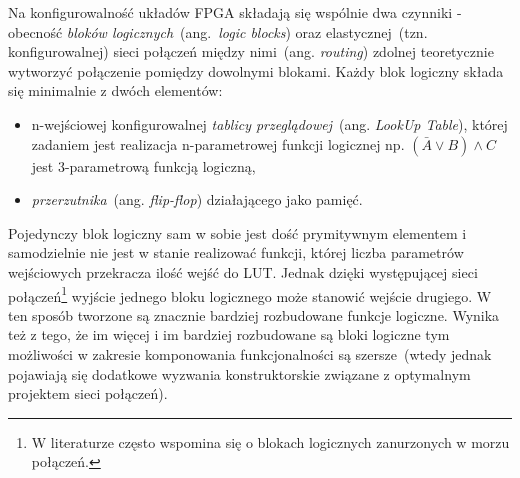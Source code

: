 Na konfigurowalność układów FPGA składają się wspólnie dwa czynniki - obecność \textit{bloków logicznych}~(ang.~\textit{logic blocks}) oraz elastycznej~(tzn. konfigurowalnej) sieci połączeń między nimi~(ang. \textit{routing}) zdolnej teoretycznie wytworzyć połączenie pomiędzy dowolnymi blokami.
Każdy blok logiczny składa się minimalnie z dwóch elementów:
\begin{itemize}
\item n-wejściowej konfigurowalnej \textit{tablicy przeglądowej}~(ang. \textit{LookUp Table}), której zadaniem jest realizacja n-parametrowej funkcji logicznej np. $(\bar{A}\vee B) \wedge C$ jest 3-parametrową funkcją logiczną,
\item \textit{przerzutnika}~(ang. \textit{flip-flop}) działającego jako pamięć.
\end{itemize}
Pojedynczy blok logiczny sam w sobie jest dość prymitywnym elementem i samodzielnie nie jest w stanie realizować funkcji, której liczba parametrów wejściowych przekracza ilość wejść do LUT. Jednak dzięki występującej sieci połączeń\footnote{W literaturze często wspomina się o blokach logicznych zanurzonych w morzu połączeń.} wyjście jednego bloku logicznego może stanowić wejście drugiego. W ten sposób tworzone są znacznie bardziej rozbudowane funkcje logiczne. Wynika też z tego, że im więcej i im bardziej rozbudowane są bloki logiczne tym możliwości w zakresie komponowania funkcjonalności są szersze~(wtedy jednak pojawiają się dodatkowe wyzwania konstruktorskie związane z optymalnym projektem sieci połączeń).

